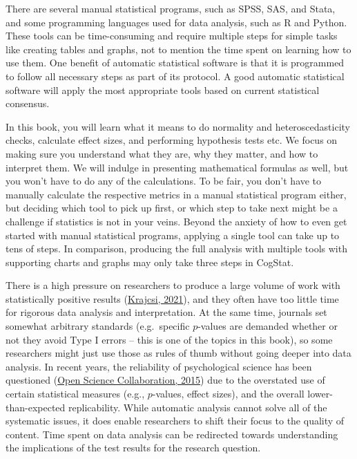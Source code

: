 \documentclass[
  11pt,
  a4paper,
  twoside,symmetric,openright]{book}
\theoremstyle{break}
\theoremstyle{break}
\begin{document}
There are several manual statistical programs, such as SPSS, SAS, and Stata, and some programming languages used for data analysis, such as R and Python. These tools can be time-consuming and require multiple steps for simple tasks like creating tables and graphs, not to mention the time spent on learning how to use them. One benefit of automatic statistical software is that it is programmed to follow all necessary steps as part of its protocol. A good automatic statistical software will apply the most appropriate tools based on current statistical consensus.

In this book, you will learn what it means to do normality and heteroscedasticity checks, calculate effect sizes, and performing hypothesis tests etc. We focus on making sure you understand what they are, why they matter, and how to interpret them. We will indulge in presenting mathematical formulas as well, but you won't have to do any of the calculations. To be fair, you don't have to manually calculate the respective metrics in a manual statistical program either, but deciding which tool to pick up first, or which step to take next might be a challenge if statistics is not in your veins. Beyond the anxiety of how to even get started with manual statistical programs, applying a single tool can take up to tens of steps. In comparison, producing the full analysis with multiple tools with supporting charts and graphs may only take three steps in CogStat.

There is a high pressure on researchers to produce a large volume of work with statistically positive results (\protect\hyperlink{ref-krajcsi_advancing_2021}{Krajcsi, 2021}), and they often have too little time for rigorous data analysis and interpretation. At the same time, journals set somewhat arbitrary standards (e.g.~specific \(p\)-values are demanded whether or not they avoid Type I errors -- this is one of the topics in this book), so some researchers might just use those as rules of thumb without going deeper into data analysis. In recent years, the reliability of psychological science has been questioned (\protect\hyperlink{ref-open_science_collaboration_estimating_2015}{Open Science Collaboration, 2015}) due to the overstated use of certain statistical measures (e.g., \(p\)-values, effect sizes), and the overall lower-than-expected replicability. While automatic analysis cannot solve all of the systematic issues, it does enable researchers to shift their focus to the quality of content. Time spent on data analysis can be redirected towards understanding the implications of the test results for the research question.
\end{document}
